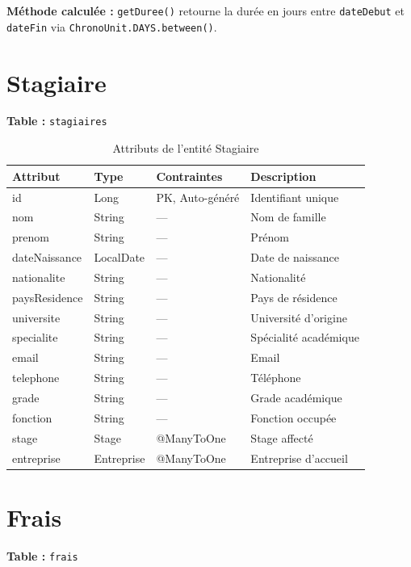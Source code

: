 \documentclass[12pt,a4paper]{report}
\begin{document}
\textbf{Méthode calculée :} \texttt{getDuree()} retourne la durée en jours entre \texttt{dateDebut} et \texttt{dateFin} via \texttt{ChronoUnit.DAYS.between()}.

\section{Stagiaire}
\textbf{Table :} \texttt{stagiaires}

\begin{table}[H]
\centering
\begin{tabular}{|l|l|l|p{5cm}|}
\hline
\textbf{Attribut} & \textbf{Type} & \textbf{Contraintes} & \textbf{Description} \\ \hline
id & Long & PK, Auto-généré & Identifiant unique \\ \hline
nom & String & --- & Nom de famille \\ \hline
prenom & String & --- & Prénom \\ \hline
dateNaissance & LocalDate & --- & Date de naissance \\ \hline
nationalite & String & --- & Nationalité \\ \hline
paysResidence & String & --- & Pays de résidence \\ \hline
universite & String & --- & Université d'origine \\ \hline
specialite & String & --- & Spécialité académique \\ \hline
email & String & --- & Email \\ \hline
telephone & String & --- & Téléphone \\ \hline
grade & String & --- & Grade académique \\ \hline
fonction & String & --- & Fonction occupée \\ \hline
stage & Stage & @ManyToOne & Stage affecté \\ \hline
entreprise & Entreprise & @ManyToOne & Entreprise d'accueil \\ \hline
\end{tabular}
\caption{Attributs de l'entité Stagiaire}
\end{table}

\section{Frais}
\textbf{Table :} \texttt{frais}
\end{document}
